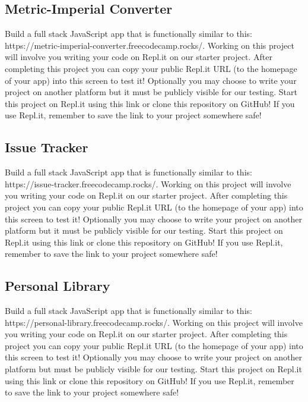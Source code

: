 \documentclass{article}%
\begin{document}
\subsection{Metric{-}Imperial Converter}%
\label{subsec:Metric{-}ImperialConverter}%
Build a full stack JavaScript app that is functionally similar to this: https://metric{-}imperial{-}converter.freecodecamp.rocks/.\newline%
Working on this project will involve you writing your code on Repl.it on our starter project. After completing this project you can copy your public Repl.it URL (to the homepage of your app) into this screen to test it! Optionally you may choose to write your project on another platform but it must be publicly visible for our testing.\newline%
Start this project on Repl.it using this link or clone this repository on GitHub! If you use Repl.it, remember to save the link to your project somewhere safe!\newline%

%
\subsection{Issue Tracker}%
\label{subsec:IssueTracker}%
Build a full stack JavaScript app that is functionally similar to this: https://issue{-}tracker.freecodecamp.rocks/.\newline%
Working on this project will involve you writing your code on Repl.it on our starter project. After completing this project you can copy your public Repl.it URL (to the homepage of your app) into this screen to test it! Optionally you may choose to write your project on another platform but it must be publicly visible for our testing.\newline%
Start this project on Repl.it using this link or clone this repository on GitHub! If you use Repl.it, remember to save the link to your project somewhere safe!\newline%

%
\subsection{Personal Library}%
\label{subsec:PersonalLibrary}%
Build a full stack JavaScript app that is functionally similar to this: https://personal{-}library.freecodecamp.rocks/.\newline%
Working on this project will involve you writing your code on Repl.it on our starter project. After completing this project you can copy your public Repl.it URL (to the homepage of your app) into this screen to test it! Optionally you may choose to write your project on another platform but must be publicly visible for our testing.\newline%
Start this project on Repl.it using this link or clone this repository on GitHub! If you use Repl.it, remember to save the link to your project somewhere safe!\newline%
\end{document}
